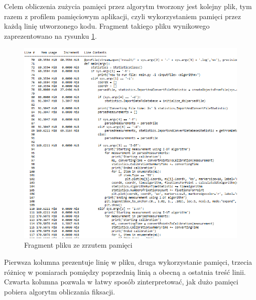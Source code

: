 Celem obliczenia zużycia pamięci przez algorytm tworzony jest kolejny plik, tym razem z profilem pamięciowym aplikacji, czyli wykorzystaniem pamięci przez każdą linię utworzonego kodu. Fragment takiego pliku wynikowego zaprezentowano na rysunku \ref{fig:memoryfile}.
\begin{figure}[H]
        \centering
        \captionsetup{justification=centering,margin=2cm}
        \includegraphics[width=\linewidth]{resources/memory_file.png}
        \caption{Fragment pliku ze zrzutem pamięci}
        \label{fig:memoryfile}
\end{figure}
Pierwsza kolumna prezentuje linię w pliku, druga wykorzystanie pamięci, trzecia różnicę w pomiarach pomiędzy poprzednią linią a obecną a ostatnia treść linii. Czwarta kolumna pozwala w łatwy sposób zinterpretować, jak dużo pamięci pobiera algorytm obliczania fiksacji.
